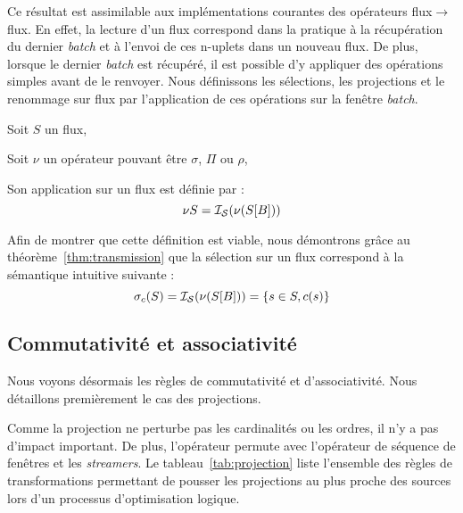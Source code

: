 Ce résultat est assimilable aux implémentations courantes des opérateurs flux$\to$flux. En effet, la lecture d'un flux correspond dans la pratique à la récupération du dernier \textit{batch} et à l'envoi de ces n-uplets dans un nouveau flux. De plus, lorsque le dernier \textit{batch} est récupéré, il est possible d'y appliquer des opérations simples avant de le renvoyer. Nous définissons les sélections, les projections et le renommage sur flux par l'application de ces opérations sur la fenêtre \textit{batch}.

\begin{coro}\label{cor:defunary}
    Soit $S$ un flux,

    Soit $\nu$ un opérateur pouvant être $\sigma$, $\Pi$ ou $\rho$,

    Son application sur un flux est définie par :
$$\nu S = \mathcal{I_S}(\nu(S[B]))$$
\end{coro}

Afin de montrer que cette définition est viable, nous démontrons grâce au théorème~\ref{thm:transmission} que la sélection sur un flux correspond à la sémantique intuitive suivante : $$\sigma_c(S) = \mathcal{I_S}(\nu(S[B])) = \{s\in S, c(s)\}$$

\subsection{Commutativité et associativité}
Nous voyons désormais les règles de commutativité et d'associativité. Nous détaillons premièrement le cas des projections.

Comme la projection ne perturbe pas les cardinalités ou les ordres, il n'y a pas d'impact important. De plus, l'opérateur permute avec l'opérateur de séquence de fenêtres et les \textit{streamers}. Le tableau~\ref{tab:projection} liste l'ensemble des règles de transformations permettant de pousser les projections au plus proche des sources lors d'un processus d'optimisation logique.

